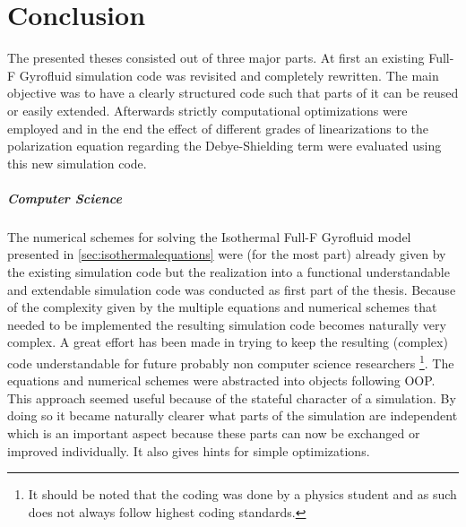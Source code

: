 \documentclass[master.tex]{subfiles}
\begin{document}
\chapter{Conclusion}
The presented theses consisted out of three major parts. At first an existing Full-F Gyrofluid simulation code was revisited and completely rewritten. The main objective was to have a clearly structured code such that parts of it can be reused or easily extended. Afterwards strictly computational optimizations were employed and in the end the effect of different grades of linearizations to the polarization equation regarding the Debye-Shielding term were evaluated using this new simulation code.



\paragraph{Computer Science}
The numerical schemes for solving the Isothermal Full-F Gyrofluid model presented in \autoref{sec:isothermalequations} were (for the most part) already given by the existing simulation code but the realization into a functional understandable and extendable simulation code was conducted as first part of the thesis. Because of the complexity given by the multiple equations and numerical schemes that needed to be implemented the resulting simulation code becomes naturally very complex. A great effort has been made in trying to keep the resulting (complex) code understandable for future probably non computer science researchers \footnote{It should be noted that the coding was done by a physics student and as such does not always follow highest coding standards.}. The equations and numerical schemes were abstracted into objects following \ac{OOP}. This approach seemed useful because of the stateful character of a simulation. By doing so it became naturally clearer what parts of the simulation are independent which is an important aspect because these parts can now be exchanged or improved individually. It also gives hints for simple optimizations.
\end{document}

